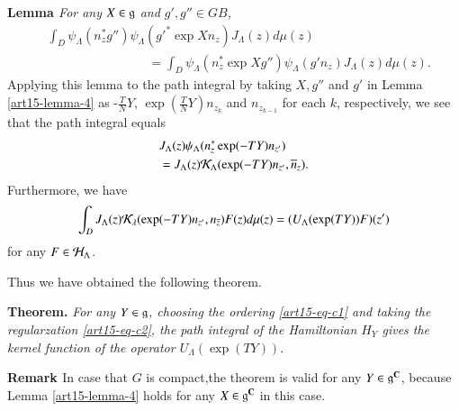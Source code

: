 \medskip
\noindent
{\bfseries Lemma  \label{art15-lemma-4}} \textit{For any $X \in \mathfrak{g}$ and $g', g'' \in GB$,}
\begin{equation*}
\begin{split}
&\int_{D}\psi_{\Lambda}(n_{z}^{*}g'')\psi_{\Lambda}(g'^{*} \exp Xn_{z})J_{\Lambda}(z)d\mu(z)\\
&\qquad \qquad \qquad \qquad =\int_{D}\psi_{\Lambda}(n_{z}^{*} \exp Xg'')\psi_{\Lambda}(g'n_{z})J_{\Lambda}(z)d \mu(z).
\end{split}
\end{equation*}
Applying this lemma to the path integral by taking $X, g''$ and $g'$ in Lemma \ref{art15-lemma-4} as -$\frac{T}{N}Y$, $\exp \left(\frac{T}{N}Y\right)n_{z_{k}}$ and $n_{z_{k-1}}$ for each $k$, respectively, we see that the path integral equals
\begin{align*}
&J_{\Lambda}(z)\psi_{\Lambda}(n_{z}^{*}\exp(-TY)n_{z'})\\
&=J_{\Lambda}(z)\mathcal{K}_{\Lambda}(\exp(-TY)n_{z'}, \overline{n}_{z}).
\end{align*}
Furthermore, we have
\begin{equation*}
\int_{D}J_{\Lambda}(z)\mathcal{K}_{\lambda}(\exp(-TY)n_{z'}, n_{\overline{z}})F(z)d\mu(z)= (U_{\Lambda}(\exp(TY))F)(z')
\end{equation*}
for any $F \in \mathcal{H}_{\Lambda}$.

Thus we have obtained the following theorem.

\medskip
\noindent
{\bfseries Theorem. \thnum{}} \textit{For any $Y \in \mathfrak{g}$, choosing the ordering \eqref{art15-eq-c1} and taking the regularzation \eqref{art15-eq-c2}, the path integral of the Hamiltonian $H_{Y}$ gives the kernel function of the operator $U_{\Lambda}(\exp(TY))$}.

\medskip
\noindent
{\bfseries Remark  \label{art15-remark-2}} In case that $G$ is compact,the theorem is valid for any $Y \in \mathfrak{g}^{\mathbf{C}}$, because Lemma \ref{art15-lemma-4} holds for any $X\in \mathfrak{g}^{\mathbf{C}}$  in this case.

